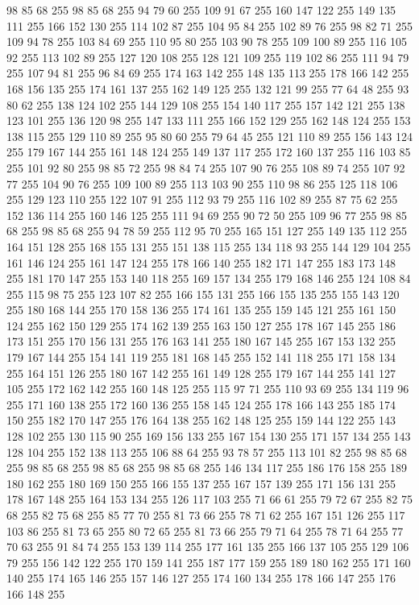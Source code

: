 98 85 68 255 98 85 68 255 94 79 60 255 109 91 67 255 160 147 122 255 149 135 111 255 166 152 130 255 114 102 87 255 104 95 84 255 102 89 76 255 98 82 71 255 109 94 78 255 103 84 69 255 110 95 80 255 103 90 78 255 109 100 89 255 116 105 92 255 113 102 89 255 127 120 108 255 128 121 109 255 119 102 86 255 111 94 79 255 107 94 81 255 96 84 69 255 174 163 142 255 148 135 113 255 178 166 142 255 168 156 135 255 174 161 137 255 162 149 125 255 132 121 99 255 77 64 48 255 93 80 62 255 138 124 102 255 144 129 108 255 154 140 117 255 157 142 121 255 138 123 101 255 136 120 98 255 147 133 111 255 166 152 129 255 162 148 124 255 153 138 115 255 129 110 89 255 95 80 60 255 79 64 45 255 121 110 89 255 156 143 124 255 179 167 144 255 161 148 124 255 149 137 117 255 172 160 137 255 116 103 85 255 101 92 80 255 98 85 72 255 98 84 74 255 107 90 76 255 108 89 74 255 107 92 77 255 104 90 76 255 109 100 89 255 113 103 90 255 110 98 86 255 125 118 106 255
129 123 110 255 122 107 91 255 112 93 79 255 116 102 89 255 87 75 62 255 152 136 114 255 160 146 125 255 111 94 69 255 90 72 50 255 109 96 77 255 98 85 68 255 98 85 68 255 94 78 59 255 112 95 70 255 165 151 127 255 149 135 112 255 164 151 128 255 168 155 131 255 151 138 115 255 134 118 93 255 144 129 104 255 161 146 124 255 161 147 124 255 178 166 140 255 182 171 147 255 183 173 148 255 181 170 147 255 153 140 118 255 169 157 134 255 179 168 146 255 124 108 84 255 115 98 75 255 123 107 82 255 166 155 131 255 166 155 135 255 155 143 120 255 180 168 144 255 170 158 136 255 174 161 135 255 159 145 121 255 161 150 124 255 162 150 129 255 174 162 139 255 163 150 127 255 178 167 145 255 186 173 151 255 170 156 131 255 176 163 141 255 180 167 145 255 167 153 132 255 179 167 144 255 154 141 119 255 181 168 145 255 152 141 118 255 171 158 134 255 164 151 126 255 180 167 142 255 161 149 128 255 179 167 144 255 141 127 105 255 172 162 142 255 160 148 125 255 115 97 71 255 110 93 69 255
134 119 96 255 171 160 138 255 172 160 136 255 158 145 124 255 178 166 143 255 185 174 150 255 182 170 147 255 176 164 138 255 162 148 125 255 159 144 122 255 143 128 102 255 130 115 90 255 169 156 133 255 167 154 130 255 171 157 134 255 143 128 104 255 152 138 113 255 106 88 64 255 93 78 57 255 113 101 82 255 98 85 68 255 98 85 68 255 98 85 68 255 98 85 68 255 146 134 117 255 186 176 158 255 189 180 162 255 180 169 150 255 166 155 137 255 167 157 139 255 171 156 131 255 178 167 148 255 164 153 134 255 126 117 103 255 71 66 61 255 79 72 67 255 82 75 68 255 82 75 68 255 85 77 70 255 81 73 66 255 78 71 62 255 167 151 126 255 117 103 86 255 81 73 65 255 80 72 65 255 81 73 66 255 79 71 64 255 78 71 64 255 77 70 63 255 91 84 74 255 153 139 114 255 177 161 135 255 166 137 105 255 129 106 79 255 156 142 122 255 170 159 141 255 187 177 159 255 189 180 162 255 171 160 140 255 174 165 146 255 157 146 127 255 174 160 134 255 178 166 147 255 176 166 148 255
